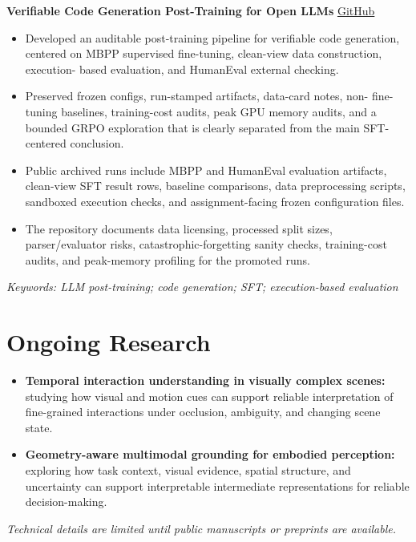 \documentclass[a4paper,9pt]{extarticle}
\begin{document}
\textbf{Verifiable Code Generation Post-Training for Open LLMs}
\hfill \href{https://github.com/checheng117/Verifiable-Code-Generation-Post-Training-Pipeline-for-Open-LLMs}{GitHub}\\
\begin{itemize}
  \item Developed an auditable post-training pipeline for verifiable code generation,
  centered on MBPP supervised fine-tuning, clean-view data construction, execution-
  based evaluation, and HumanEval external checking.
  \item Preserved frozen configs, run-stamped artifacts, data-card notes, non-
  fine-tuning baselines, training-cost audits, peak GPU memory audits, and a bounded
  GRPO exploration that is clearly separated from the main SFT-centered conclusion.
  \item Public archived runs include MBPP and HumanEval evaluation artifacts, clean-view
  SFT result rows, baseline comparisons, data preprocessing scripts, sandboxed
  execution checks, and assignment-facing frozen configuration files.
  \item The repository documents data licensing, processed split sizes, parser/evaluator
  risks, catastrophic-forgetting sanity checks, training-cost audits, and peak-memory
  profiling for the promoted runs.
\end{itemize}
\textit{Keywords: LLM post-training; code generation; SFT; execution-based evaluation}
\vspace{0.34\baselineskip}

\section*{Ongoing Research}
\begin{itemize}
  \item \textbf{Temporal interaction understanding in visually complex scenes:}
  studying how visual and motion cues can support reliable interpretation of
  fine-grained interactions under occlusion, ambiguity, and changing scene state.
  \item \textbf{Geometry-aware multimodal grounding for embodied perception:}
  exploring how task context, visual evidence, spatial structure, and uncertainty can
  support interpretable intermediate representations for reliable decision-making.
\end{itemize}
\textit{Technical details are limited until public manuscripts or preprints are available.}
\end{document}
